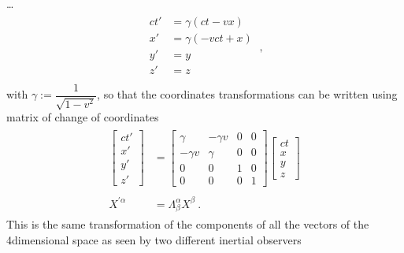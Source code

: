 \documentclass[letterpaper,10pt,english]{jupyterBook}
\begin{document}
\sphinxAtStartPar
… 
\begin{equation*}
\begin{split}\begin{aligned}
  ct' & = \gamma ( ct - v x ) \\
   x' & = \gamma ( - v ct + x) \\
   y' & = y         \\
   z' & = z         \\
\end{aligned} \ ,\end{split}
\end{equation*}
\sphinxAtStartPar
with \(\gamma := \dfrac{1}{\sqrt{1 - v^2}}\), so that the coordinates transformations can be written using matrix of change of coordinates
\begin{equation*}
\begin{split}\begin{aligned}
  \begin{bmatrix} ct' \\ x' \\ y' \\ z'  \end{bmatrix} & = \begin{bmatrix} \gamma & - \gamma v & 0 & 0 \\ - \gamma v & \gamma & 0 & 0 \\ 0 & 0 & 1 & 0 \\ 0 & 0 & 0 & 1  \end{bmatrix} \begin{bmatrix} ct \\ x \\ y \\ z \end{bmatrix} \\ \\
  X^{'\alpha} & = \Lambda_{\beta}^{\alpha} X^{\beta}  \ .
\end{aligned}\end{split}
\end{equation*}
\sphinxAtStartPar
This is the same transformation of the components of all the vectors of the 4\sphinxhyphen{}dimensional space as seen by two different inertial observers
\end{document}
